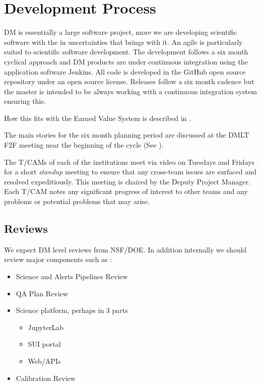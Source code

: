 \section{Development Process} \label{sect:devproc}

DM is essentially a large software project, more we are developing scientific software with the in uncertainties that brings with it. 
An agile \citep{it:agile} is particularly suited to scientific software development.  The development follows a six month  cyclical approach and  DM  products are under continuous
integration using the application software Jenkins. All code is developed in the GitHub open source repository under an open source license.
Releases follow a six month cadence but the master is intended to be always working with a continuous integration system ensuring this.

How this fits with the Earned Value System is described in .



The main stories for the six month planning period are discussed at the DMLT F2F meeting near the beginning of the cycle (See ). 

The T/CAMs of each of the institutions meet via video on Tuesdays and Fridays for a short \emph{standup} meeting to ensure that any cross-team issues are surfaced and resolved expeditiously.
This meeting is chaired by the Deputy Project Manager.
Each T/CAM notes any significant progress of interest to other teams and any problems or potential problems that may arise.

\subsection{Reviews} \label{sect:reviews}
We expect DM level reviews from NSF/DOE. In addition internally we should review major components such as :
\begin{itemize}

\item  Science and Alerts Pipelines Review 
\item   QA Plan Review 
  \item  Science platform, perhaps in 3 parts
	\begin{itemize}
	  \item  JupyterLab 
	  \item SUI portal
	  \item Web/APIs
	\end{itemize}
  \item  Calibration Review 

\end{itemize}

